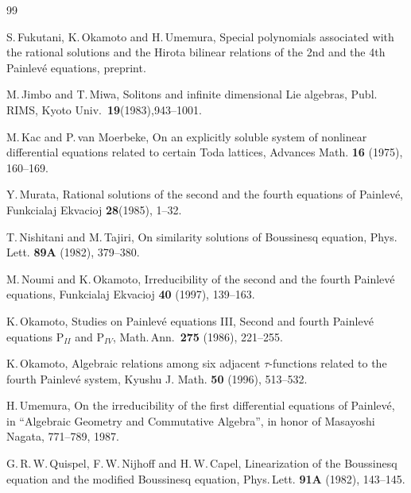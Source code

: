 \begin{thebibliography}{99}

 S.\,Fukutani, K.\,Okamoto and H.\,Umemura,
Special polynomials associated with the rational solutions and 
the Hirota bilinear relations of the 2nd and the 4th Painlev\'e 
equations, preprint.

 M.\,Jimbo and T.\,Miwa, 
Solitons and infinite dimensional Lie algebras, 
Publ.\,RIMS, Kyoto Univ.\, {\bf 19}(1983),943--1001.

 M.\,Kac and P.\,van Moerbeke,
On an explicitly soluble system of nonlinear differential equations
related to certain Toda lattices,
Advances Math. {\bf 16} (1975), 160--169.

 Y.\,Murata,
Rational solutions of the second and the fourth equations of Painlev\'e,
Funkcialaj Ekvacioj {\bf 28}(1985), 1--32.

 T.\,Nishitani and M.\,Tajiri,
On similarity solutions of Boussinesq equation,
Phys.\,Lett. {\bf 89A} (1982), 379--380.

 M.\,Noumi and K.\,Okamoto, 
Irreducibility of the second and the fourth 
Painlev\'e equations, 
Funkcialaj Ekvacioj {\bf 40} (1997), 139--163.

 K.\,Okamoto, 
Studies on Painlev\'e equations {III}, Second 
and fourth Painlev\'e equations $\mbox{P}_{{II}}$ and 
$\mbox{P}_{{IV}}$, 
Math.\,Ann.\, {\bf 275} (1986), 221--255.

 K.\,Okamoto,
Algebraic relations among six adjacent $\tau$-functions related to
the fourth Painlev\'e system,
Kyushu J. Math. {\bf 50} (1996), 513--532. 

 H.\,Umemura,
On the irreducibility of the first differential equations of Painlev\'e,
in ``Algebraic Geometry and Commutative Algebra'', in honor of 
Masayoshi Nagata, 771--789, 1987. 

G.\,R.\,W.\,Quispel, F.\,W.\,Nijhoff and H.\,W.\,Capel,
Linearization of the Boussinesq equation and the modified Boussinesq equation,
Phys.\,Lett. {\bf 91A} (1982), 143--145.


\end{thebibliography}







